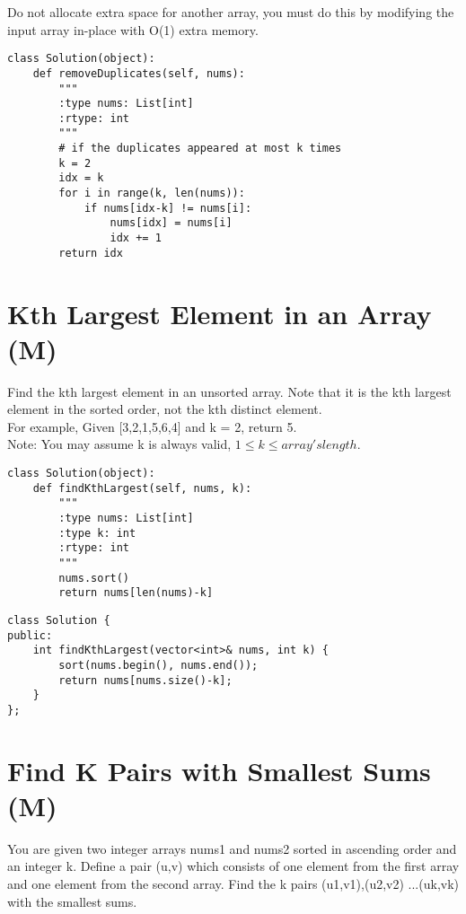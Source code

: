 Do not allocate extra space for another array, you must do this by modifying the input array in-place with O(1) extra memory.\\

\begin{lstlisting}
class Solution(object):
    def removeDuplicates(self, nums):
        """
        :type nums: List[int]
        :rtype: int
        """
        # if the duplicates appeared at most k times
        k = 2
        idx = k
        for i in range(k, len(nums)):
            if nums[idx-k] != nums[i]:
                nums[idx] = nums[i]
                idx += 1
        return idx
\end{lstlisting}

\section{Kth Largest Element in an Array (M)}
Find the kth largest element in an unsorted array. Note that it is the kth largest element in the sorted order, not the kth distinct element.\\

For example,
Given [3,2,1,5,6,4] and k = 2, return 5.\\

Note:
You may assume k is always valid, $1 \leq k \leq array's length$.\\

\begin{lstlisting}
class Solution(object):
    def findKthLargest(self, nums, k):
        """
        :type nums: List[int]
        :type k: int
        :rtype: int
        """
        nums.sort()
        return nums[len(nums)-k]
\end{lstlisting}

\begin{lstlisting}
class Solution {
public:
    int findKthLargest(vector<int>& nums, int k) {   
        sort(nums.begin(), nums.end());
        return nums[nums.size()-k];
    }
};
\end{lstlisting}


\section{Find K Pairs with Smallest Sums (M)}
You are given two integer arrays nums1 and nums2 sorted in ascending order and an integer k. Define a pair (u,v) which consists of one element from the first array and one element from the second array. Find the k pairs (u1,v1),(u2,v2) ...(uk,vk) with the smallest sums.\\

